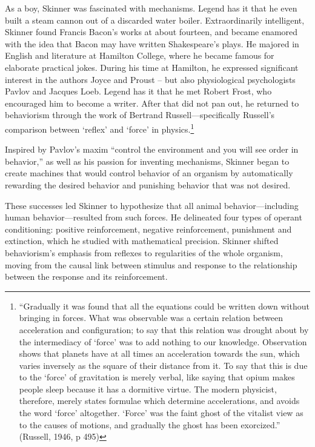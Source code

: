 As a boy, Skinner was fascinated with mechanisms. Legend has it that he even built a steam cannon out of a discarded water boiler. Extraordinarily intelligent, Skinner found Francis Bacon's works at about fourteen, and became enamored with the idea that Bacon may have written Shakespeare's plays. He majored in English and literature at Hamilton College, where he became famous for elaborate practical jokes. During his time at Hamilton, he expressed significant interest in the authors Joyce and Proust – but also physiological psychologists Pavlov and Jacques Loeb. Legend has it that he met Robert Frost, who encouraged him to become a writer. After that did not pan out, he returned to behaviorism through the work of Bertrand Russell---specifically Russell's comparison between `reflex' and `force' in physics.\footnote{``Gradually it was found that all the equations could be written down without bringing in forces. What was observable was a certain relation between acceleration and configuration; to say that this relation was drought about by the intermediacy of `force' was to add nothing to our knowledge. Observation shows that planets have at all times an acceleration towards the sun, which varies inversely as the square of their distance from it. To say that this is due to the `force' of gravitation is merely verbal, like saying that opium makes people sleep because it has a dormitive virtue. The modern physicist, therefore, merely states formulae which determine accelerations, and avoids the word `force' altogether. `Force' was the faint ghost of the vitalist view as to the causes of motions, and gradually the ghost has been exorcized.'' (Russell, 1946, p 495)}

Inspired by Pavlov's maxim ``control the environment and you will see order in behavior,'' as well as his passion for inventing mechanisms, Skinner began to create machines that would control behavior of an organism by automatically rewarding the desired behavior and punishing behavior that was not desired.

These successes led Skinner to hypothesize that all animal behavior---including human behavior---resulted from such forces. He delineated four types of operant conditioning: positive reinforcement, negative reinforcement, punishment and extinction, which he studied with mathematical precision. Skinner shifted behaviorism's emphasis from reflexes to regularities of the whole organism, moving from the causal link between stimulus and response to the relationship between the response and its reinforcement.

